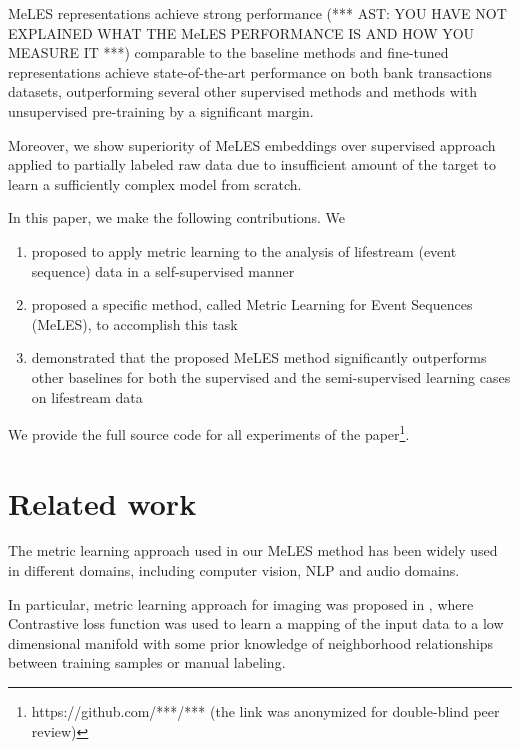 \documentclass[sigconf, anonymous]{acmart}
\begin{document}

MeLES representations achieve strong performance (*** AST: YOU HAVE NOT EXPLAINED WHAT THE MeLES PERFORMANCE IS    AND HOW YOU MEASURE IT ***) comparable to the baseline methods and  fine-tuned representations achieve state-of-the-art performance on both bank transactions datasets, outperforming several other supervised methods and methods with unsupervised pre-training by a significant margin.

Moreover, we show superiority of MeLES embeddings over supervised approach applied to partially labeled raw data due to insufficient amount of the target to learn a sufficiently complex model from scratch.

In this paper, we make the following contributions. We
\begin{enumerate}
    \item proposed to apply metric learning to the analysis of lifestream (event sequence) data in a self-supervised manner
    \item proposed a specific method, called Metric Learning for Event Sequences (MeLES), to accomplish this task 
    \item demonstrated that the proposed MeLES method significantly outperforms other baselines for both the supervised and the semi-supervised learning cases on lifestream data
\end{enumerate}

We provide the full source code for all experiments of the paper\footnote{https://github.com/***/*** (the link was anonymized for double-blind peer review)}.

\section{Related work} \label{sec-rel-work}

The metric learning approach used in our MeLES method has been widely used in different domains, including computer vision, NLP and audio domains. 

In particular, metric learning approach for imaging was proposed in \cite{Hadsell:2006:DRL:1153171.1153654}, where Contrastive loss function was used to learn a mapping of the input data to a low dimensional manifold with some prior knowledge of neighborhood relationships between training samples or manual labeling.
\end{document}
